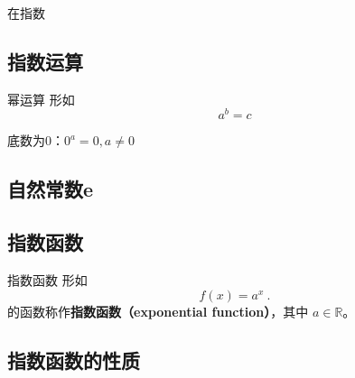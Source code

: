 
\begin{issues}
\issueDraft
\end{issues}


在指数

\subsection{指数运算}
\begin{definition}{幂运算}
形如
\begin{equation}
a^b=c
\end{equation}

\end{definition}

底数为0：$0^a=0,a\neq0$
\subsection{自然常数e}

\subsection{指数函数}

\begin{definition}{指数函数}
形如
\begin{equation}
f(x) = a^x~.
\end{equation}
的函数称作\textbf{指数函数（exponential function）}，其中 $a\in\mathbb R$。
\end{definition}
\subsection{指数函数的性质}

